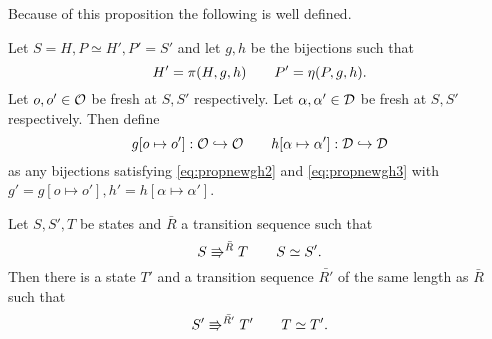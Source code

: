 Because of this proposition the following is well defined.

\begin{definition} \label{def:bijectionmod}
  Let $S = H, P \simeq H', P' = S'$ and let $g, h$ be the bijections such that
  \begin{equation} 
    H' = \pi(H, g, h) \quad\quad P' = \eta(P, g, h).
  \end{equation}
  Let $o, o' \in \mathcal{O}$ be fresh at $S, S'$ respectively.
  Let $\alpha, \alpha' \in \mathcal{D}$ be fresh at $S, S'$ respectively.
  Then define
  \begin{equation}
    g[o \mapsto o']: \mathcal{O} \hookrightarrow \mathcal{O} 
    \quad\quad h[\alpha \mapsto \alpha']: \mathcal{D} \hookrightarrow \mathcal{D}
  \end{equation}
  as any bijections satisfying \eqref{eq:propnewgh2} and \eqref{eq:propnewgh3}
  with $g' = g[o \mapsto o'], h' = h[\alpha \mapsto \alpha']$.
\end{definition}

\begin{lemma} \label{lem:lemma3}
  Let $S, S', T$ be states and $\bar{R}$ a transition sequence such that
  \begin{equation*}
    S \Rrightarrow^{\bar{R}} T \quad\quad S \simeq S'.
  \end{equation*}
  Then there is a state $T'$ and a transition sequence $\bar{R'}$ of the same
  length as $\bar{R}$ such that
  \begin{equation*}
    S' \Rrightarrow^{\bar{R'}} T' \quad\quad T \simeq T'.
  \end{equation*}
\end{lemma}



